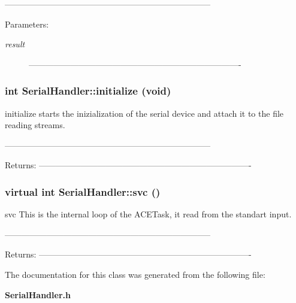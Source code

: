 -------------------------------------------------------------------------- 

\begin{Desc}
\item[Parameters:]
\begin{description}
\item[{\em result}]---------------------------------------------------------------------------- \end{description}
\end{Desc}
\subsubsection{\setlength{\rightskip}{0pt plus 5cm}int Serial\-Handler::initialize (void)}\label{classSerialHandler_a2}


initialize starts the inizialization of the serial device and attach it to the file reading streams. 

-------------------------------------------------------------------------- 

\begin{Desc}
\item[Returns:]---------------------------------------------------------------------------- \end{Desc}
\subsubsection{\setlength{\rightskip}{0pt plus 5cm}virtual int Serial\-Handler::svc ()\hspace{0.3cm}{\tt  [virtual]}}\label{classSerialHandler_a3}


svc This is the internal loop of the ACETask, it read from the standart input. 

-------------------------------------------------------------------------- 

\begin{Desc}
\item[Returns:]---------------------------------------------------------------------------- \end{Desc}


The documentation for this class was generated from the following file:\begin{CompactItemize}
\item 
{\bf Serial\-Handler.h}\end{CompactItemize}
